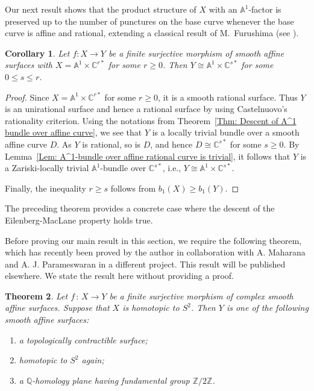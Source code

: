 \documentclass[12pt,reqno,twoside]{amsart}
\newtheorem{theorem}{Theorem}[section]
\newtheorem{cor}[theorem]{Corollary}
\theoremstyle{definition}
\numberwithin{equation}{section}
\newcommand{\A}{\mathbb{A}}
\newcommand{\C}{\mathbb{C}}
\newcommand{\Q}{\mathbb{Q}}
\newcommand{\Z}{\mathbb{Z}}
\newcommand{\st}{\,:\,}
\begin{document}
Our next result shows that the product structure of $X$ with an $\A^1$-factor is preserved up to the number of punctures on the base curve whenever the base curve is affine and rational, extending a classical result of M.~Furushima (see \cite[Main Theorem, non-singular case]{Fur1989}).

\begin{cor}\label{Cor: Generalization of Furushima's result}
	Let $f: X \to Y$ be a finite surjective morphism of smooth affine surfaces with $X=\A^1 \times \C^{r*}$ for some $r \geq 0$. Then $Y \cong \A^1 \times \C^{s*}$ for some $0\leq s \leq r$.
\end{cor}

\begin{proof}
    Since $X=\A^1 \times \C^{r*}$ for some $r \geq 0$, it is a smooth rational surface. Thus $Y$ is an unirational surface and hence a rational surface by using Castelnuovo's rationality criterion. Using the notations from Theorem~\ref{Thm: Descent of A^1 bundle over affine curve}, we see that $Y$ is a locally trivial bundle over a smooth affine curve $D$. As $Y$ is rational, so is $D$, and hence $D \cong \C^{s*}$ for some $s \geq 0$. By Lemma~\ref{Lem: A^1-bundle over affine rational curve is trivial}, it follows that $Y$ is a Zariski-locally trivial $\A^1$-bundle over $\C^{s*}$, i.e., $Y \cong \A^1 \times \C^{s*}$.

    Finally, the inequality $r \geq s$ follows from $b_1(X) \geq b_1(Y)$.
\end{proof}

The preceding theorem provides a concrete case where the descent of the Eilenberg-MacLane property holds true.\\

\medskip

Before proving our main result in this section, we require the following theorem, which has recently been proved by the author in collaboration with A. Maharana and A. J. Parameswaran in a different project. This result will be published elsewhere. We state the result here without providing a proof.

\begin{theorem}\label{Thm: proper descent of homotopy sphere}
    Let $f\st X \to Y$ be a finite surjective morphism of complex smooth affine surfaces. Suppose that $X$ is homotopic to $S^2$. Then $Y$ is one of the following smooth affine surfaces:
    \begin{enumerate}[\indent\rm(1)]
        \item a topologically contractible surface;
        \item homotopic to $S^2$ again;
        \item a $\Q$-homology plane having fundamental group $\Z/2\Z$.
    \end{enumerate}
\end{theorem}
\end{document}
